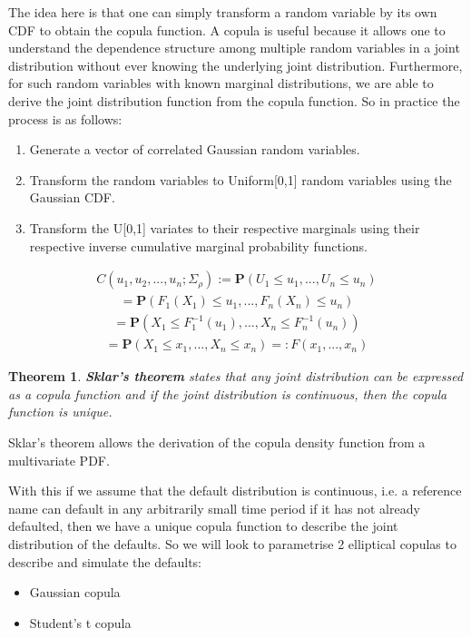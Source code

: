 \documentclass{report}
\theoremstyle{plain}
\newtheorem{thm}{Theorem}[chapter] %
\theoremstyle{definition}
\begin{document}
The idea here is that one can simply transform a random variable by its own CDF to obtain the copula function. A copula is useful because it allows one to understand the dependence structure among multiple random variables in a joint distribution without ever knowing the underlying joint distribution. Furthermore, for such random variables with known marginal distributions,  we are able to derive the joint distribution function from the copula function. So in practice the process is as follows:

\begin{enumerate}
	\item Generate a vector of correlated Gaussian random variables.
	\item Transform the random variables to Uniform[0,1] random variables using the Gaussian CDF.
	\item Transform the U[0,1] variates to their respective marginals using their respective inverse cumulative marginal probability functions.
\end{enumerate}

\begin{align*}
C(u_1,u_2,...,u_n;\Sigma_\rho) := \mathbf{P}(U_1 \leq u_1,...,U_n \leq u_n)
\end{align*}
\begin{align*}
= \mathbf{P}(F_1(X_1) \leq u_1,...,F_n(X_n) \leq u_n)
\end{align*}
\begin{align*}
= \mathbf{P}(X_1 \leq F_1^{-1}(u_1),...,X_n \leq F_n^{-1}(u_n))
\end{align*}
\begin{align*}
= \mathbf{P}(X_1 \leq x_1,...,X_n \leq x_n) =: F(x_1,...,x_n)
\end{align*}

\begin{thm}
	\textbf{Sklar's theorem} states that any joint distribution can be expressed as a copula function and if the joint distribution is continuous, then the copula function is unique. 
\end{thm}

Sklar's theorem allows the derivation of the copula density function from a multivariate PDF.

With this if we assume that the default distribution is continuous, i.e. a reference name can default in any arbitrarily small time period if it has not already defaulted, then we have a unique copula function to describe the joint distribution of the defaults. So we will look to parametrise 2 elliptical copulas to describe and simulate the defaults: 
\begin{itemize}
	\item Gaussian copula
	\item Student's t copula
\end{itemize}
\end{document}
